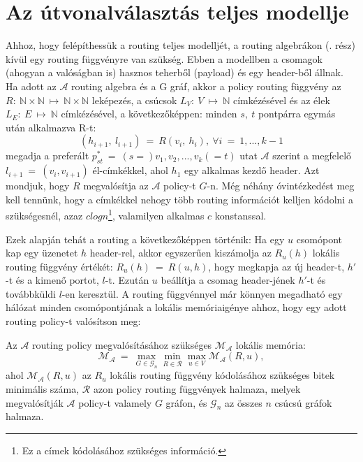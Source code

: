   \section{Az útvonalválasztás teljes modellje }\label{routingmodell}
  Ahhoz, hogy felépíthessük a routing teljes modelljét, a routing algebrákon (. rész) kívül egy routing függvényre van szükség. Ebben a modellben a csomagok (ahogyan a valóságban is) hasznos teherből (payload) és egy header-ből állnak. Ha adott az $\mathcal{A}$ routing algebra és a G gráf, akkor a policy routing függvény az $R:~ \mathbb{N} \times \mathbb{N}~\mapsto~\mathbb{N} \times \mathbb{N}$ leképezés, a csúcsok $L_{V}:~V~\mapsto~\mathbb{N}$ címkézésével és az élek $L_{E}:~E~\mapsto~\mathbb{N}$ címkézésével, a következőképpen: minden $s,~t$ pontpárra egymás után alkalmazva R-t:
  $$(h_{i+1},~l_{i+1})~=~R(v_{i},~h_{i}),~\forall i~=~1, ..., k-1$$
  megadja a preferált $p_{st}^{*}~=~(s=) v_{1}, v_{2}, ..., v_{k}(=t)$ utat $\mathcal{A}$ szerint a megfelelő $l_{i+1}~=~(v_{i},v_{i+1})$ él-címkékkel, ahol $h_{1}$ egy alkalmas kezdő header. Azt mondjuk, hogy $R$ megvalósítja az $\mathcal{A}$ policy-t $G$-n. Még néhány óvintézkedést meg kell tennünk, hogy a címkékkel nehogy több routing információt kelljen kódolni a szükségesnél, azaz $c log n$\footnote{ Ez a címek kódolásához szükséges információ.}, valamilyen alkalmas $c$ konstanssal.

  Ezek alapján tehát a routing a következőképpen történik: Ha egy $u$ csomópont kap egy üzenetet $h$ header-rel, akkor egyszerűen kiszámolja az $R_{u}(h)$ lokális routing függvény értékét: $R_{u}(h)~=~R(u,h)$, hogy megkapja az új header-t, $h'$-t és a kimenő portot, $l$-t. Ezután $u$ beállítja a csomag header-jének $h'$-t és továbbküldi $l$-en keresztül.
  A routing függvénnyel már könnyen megadható egy hálózat minden csomópontjának a lokális memóriaigénye ahhoz, hogy egy adott routing policy-t valósítson meg:
  \begin{definition} 
    Az $\mathcal{A}$ routing policy megvalósításához szükséges $\mathcal{M_{\mathcal{A}}}$ lokális memória: $$\mathcal{M_{\mathcal{A}}}~=~\max_{G \in \mathcal{G}_{n}}{ \min_{R \in \mathcal{R}}{\max_{u \in V}{ \mathcal{M_{\mathcal{A}}}(R,u)}}},$$ ahol $\mathcal{M_{\mathcal{A}}}(R,u)$ az $R_{u}$ lokális routing függvény kódolásához szükséges bitek minimális száma, $\mathcal{R}$ azon policy routing függvények halmaza, melyek megvalósítják $\mathcal{A}$ policy-t valamely $G$ gráfon, és $\mathcal{G}_{n}$ az összes $n$ csúcsú gráfok halmaza.
  \end{definition}

